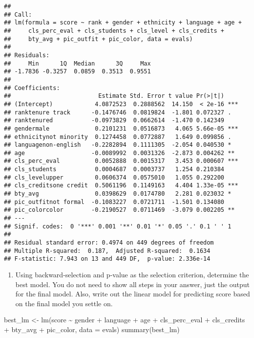 \documentclass[
]{article}
\newenvironment{Shaded}{\begin{snugshade}}{\end{snugshade}}
\newcommand{\AttributeTok}[1]{\textcolor[rgb]{0.77,0.63,0.00}{#1}}
\newcommand{\FunctionTok}[1]{\textcolor[rgb]{0.00,0.00,0.00}{#1}}
\newcommand{\NormalTok}[1]{#1}
\newcommand{\OtherTok}[1]{\textcolor[rgb]{0.56,0.35,0.01}{#1}}
\newcommand{\SpecialCharTok}[1]{\textcolor[rgb]{0.00,0.00,0.00}{#1}}
\providecommand{\tightlist}{%
  \setlength{\itemsep}{0pt}\setlength{\parskip}{0pt}}
\begin{document}
\begin{verbatim}
## 
## Call:
## lm(formula = score ~ rank + gender + ethnicity + language + age + 
##     cls_perc_eval + cls_students + cls_level + cls_credits + 
##     bty_avg + pic_outfit + pic_color, data = evals)
## 
## Residuals:
##     Min      1Q  Median      3Q     Max 
## -1.7836 -0.3257  0.0859  0.3513  0.9551 
## 
## Coefficients:
##                         Estimate Std. Error t value Pr(>|t|)    
## (Intercept)            4.0872523  0.2888562  14.150  < 2e-16 ***
## ranktenure track      -0.1476746  0.0819824  -1.801 0.072327 .  
## ranktenured           -0.0973829  0.0662614  -1.470 0.142349    
## gendermale             0.2101231  0.0516873   4.065 5.66e-05 ***
## ethnicitynot minority  0.1274458  0.0772887   1.649 0.099856 .  
## languagenon-english   -0.2282894  0.1111305  -2.054 0.040530 *  
## age                   -0.0089992  0.0031326  -2.873 0.004262 ** 
## cls_perc_eval          0.0052888  0.0015317   3.453 0.000607 ***
## cls_students           0.0004687  0.0003737   1.254 0.210384    
## cls_levelupper         0.0606374  0.0575010   1.055 0.292200    
## cls_creditsone credit  0.5061196  0.1149163   4.404 1.33e-05 ***
## bty_avg                0.0398629  0.0174780   2.281 0.023032 *  
## pic_outfitnot formal  -0.1083227  0.0721711  -1.501 0.134080    
## pic_colorcolor        -0.2190527  0.0711469  -3.079 0.002205 ** 
## ---
## Signif. codes:  0 '***' 0.001 '**' 0.01 '*' 0.05 '.' 0.1 ' ' 1
## 
## Residual standard error: 0.4974 on 449 degrees of freedom
## Multiple R-squared:  0.187,  Adjusted R-squared:  0.1634 
## F-statistic: 7.943 on 13 and 449 DF,  p-value: 2.336e-14
\end{verbatim}

\begin{enumerate}
\def\labelenumi{\arabic{enumi}.}
\setcounter{enumi}{14}
\tightlist
\item
  Using backward-selection and p-value as the selection criterion,
  determine the best model. You do not need to show all steps in your
  answer, just the output for the final model. Also, write out the
  linear model for predicting score based on the final model you settle
  on.
\end{enumerate}

\begin{Shaded}
\begin{Highlighting}[]
\NormalTok{best\_lm }\OtherTok{\textless{}{-}} \FunctionTok{lm}\NormalTok{(score }\SpecialCharTok{\textasciitilde{}}\NormalTok{ gender }\SpecialCharTok{+}\NormalTok{ language }\SpecialCharTok{+}\NormalTok{ age }\SpecialCharTok{+}\NormalTok{ cls\_perc\_eval }\SpecialCharTok{+}\NormalTok{ cls\_credits }\SpecialCharTok{+}\NormalTok{ bty\_avg }\SpecialCharTok{+}
\NormalTok{    pic\_color, }\AttributeTok{data =}\NormalTok{ evals)}
\FunctionTok{summary}\NormalTok{(best\_lm)}
\end{Highlighting}
\end{Shaded}
\end{document}
